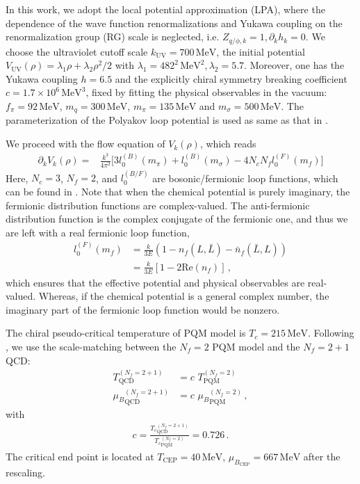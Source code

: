 \documentclass[%
reprint,
superscriptaddress,
preprintnumbers,
amsmath,amssymb,
aps,
prd,
]{revtex4-2}
\begin{document}
In this work, we adopt the local potential approximation (LPA), where the dependence of the wave function renormalizations and Yukawa coupling on the renormalization group (RG) scale is neglected, i.e. $Z_{q/\phi,k}=1,\partial_k h_k=0$. We choose the ultraviolet cutoff scale $k_{\mathrm{UV}}=700\,\text{MeV}$, the initial potential $V_{\mathrm{UV}}(\rho)=\lambda_1 \rho+ \lambda_2\rho^2/2$ with $\lambda_1=482^2\,\text{MeV}^2, \lambda_2=5.7$. Moreover, one has the Yukawa coupling $h=6.5$ and the explicitly chiral symmetry breaking coefficient $c=1.7 \times 10^6 \,\text{MeV}^3$, fixed by fitting the physical observables in the vacuum: $f_\pi=92\,\text{MeV}$, $m_q=300\,\text{MeV}$, $m_\pi=135\,\text{MeV}$ and $m_\sigma=500\,\text{MeV}$. The parameterization of the Polyakov loop potential is used as same as that in \cite{Fu:2021oaw}.

We proceed with the flow equation of $V_k(\rho)$, which reads
\begin{align}
\partial_k V_k(\rho)=&\frac{k^3}{4 \pi^2}\Big[3 l_0^{(B)}(m_\pi) + l_0^{(B)}(m_\sigma) - 4 N_c N_f l_0^{(F)}(m_f)\Big]
\end{align}
Here, $N_c=3$, $N_f=2$, and $l_0^{(B/F)}$ are bosonic/fermionic loop functions, which can be found in \cite{Fu:2015naa, Fu:2021oaw, Wen:2018nkn}. Note that when the chemical potential is purely imaginary, the fermionic distribution functions are complex-valued. The anti-fermionic distribution function is the complex conjugate of the fermionic one, and thus we are left with a real fermionic loop function, 
\begin{align}
l_0^{(F)}(m_f)&=\frac{k}{3 E}(1-n_f(L,\bar L)-\bar n_f(\bar L, L)) \nonumber \\
&=\frac{k}{3 E}[1-2 \text{Re}(n_f)]\,, 
\end{align}
which ensures that the effective potential and physical observables are real-valued. Whereas, if the chemical potential is a general complex number, the imaginary part of the fermionic loop function would be nonzero.

The chiral pseudo-critical temperature of PQM model is $T_c=215\, \mathrm{MeV}$. Following \cite{Fu:2021oaw}, we use the scale-matching between the $N_f=2$ PQM model and the $N_f=2+1$ QCD:
\begin{align}
T^{(N_f=2+1)}_{\mathrm{QCD}}&=c\,\,T^{(N_f=2)}_{\mathrm{PQM}}\\
{\mu_B}^{(N_f=2+1)}_{\mathrm{QCD}}&=c\,\,{\mu_B}^{(N_f=2)}_{\mathrm{PQM}}\,,
\end{align}
with
\begin{align}
c=\frac{{T_c}^{(N_f=2+1)}_{\mathrm{QCD}}}{{T_c}^{(N_f=2)}_{\mathrm{PQM}}}=0.726 \,.
\end{align}
The critical end point is located at $T_{\mathrm{CEP}}=40\,\mathrm{MeV}$, $\mu_{B_{\mathrm{CEP}}}=667\,\mathrm{MeV}$ after the rescaling.
	
\end{document}

